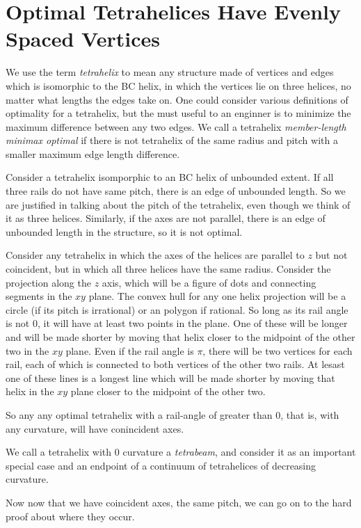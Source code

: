 \documentclass[11pt]{article}
\begin{document}
\section{Optimal Tetrahelices Have Evenly Spaced Vertices}

We use the term \emph{tetrahelix} to mean any structure made of
vertices and edges which is isomorphic to the BC helix, in which the
vertices lie on three helices, no matter what lengths the edges take
on. One could consider various definitions of optimality for a
tetrahelix, but the must useful to an enginner is to minimize the
maximum difference between any two edges. We call a tetrahelix
\emph{member-length minimax optimal} if there is not tetrahelix of the
same radius and pitch with a smaller maximum edge length difference.

Consider a tetrahelix isomporphic to an BC helix of unbounded
extent. If all three rails do not have same pitch, there is an edge of
unbounded length. So we are justified in talking about the pitch of
the tetrahelix, even though we think of it as three
helices. Similarly, if the axes are not parallel, there is an edge of
unbounded length in the structure, so it is not optimal.

Consider any tetrahelix in which the axes of the helices are parallel
to $z$ but not coincident, but in which all three helices have the
same radius. Consider the projection along the $z$ axis, which will be
a figure of dots and connecting segments in the $xy$ plane. The convex
hull for any one helix projection will be a circle (if its pitch is
irrational) or an polygon if rational. So long as its rail angle is
not $0$, it will have at least two points in the plane. One of these
will be longer and will be made shorter by moving that helix closer to
the midpoint of the other two in the $xy$ plane. Even if the rail
angle is $\pi$, there will be two vertices for each rail, each of
which is connected to both vertices of the other two rails. At lesast
one of these lines is a longest line which will be made shorter by
moving that helix in the $xy$ plane closer to the midpoint of the
other two.

So any any optimal tetrahelix with a rail-angle of greater than $0$,
that is, with any curvature, will have conincident axes.

We call a tetrahelix with $0$ curvature a \emph{tetrabeam}, and
consider it as an important special case and an endpoint of a
continuum of tetrahelices of decreasing curvature.


 Now now that we have coincident axes, the same pitch, we can go on to
 the hard proof about where they occur.
\end{document}
